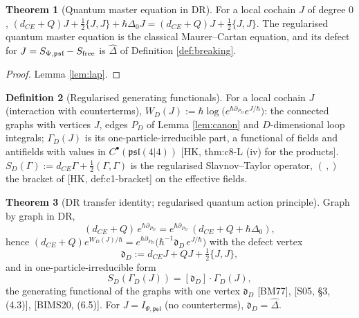 \documentclass[11pt]{article}
\theoremstyle{definition}
\newtheorem{definition}{Definition}[section]
\newtheorem{theorem}[definition]{Theorem}
\numberwithin{equation}{section}
\begin{document}
\begin{theorem}[Quantum master equation in DR]
\label{thm:qme}
For a local cochain $J$ of degree $0$, $(d_{CE}+Q)J+\frac12\{J,J\}+\hbar\Delta_0J=(d_{CE}+Q)J+\frac12\{J,J\}$. The regularised quantum master equation is the classical Maurer--Cartan equation, and its defect for $J=S_{\Psi,\mathfrak{psl}}-S_{\rm free}$ is $\widehat\Delta$ of Definition \ref{def:breaking}.
\end{theorem}

\begin{proof}
Lemma \ref{lem:lap}.
\end{proof}

\begin{definition}[Regularised generating functionals]
\label{def:WD}
For a local cochain $J$ (interaction with counterterms), $W_D(J):=\hbar\log\big(e^{\hbar\partial_{P_D}}e^{J/\hbar}\big)$: the connected graphs with vertices $J$, edges $P_D$ of Lemma \ref{lem:canon} and $D$-dimensional loop integrals; $\Gamma_D(J)$ is its one-particle-irreducible part, a functional of fields and antifields with values in $C^\bullet(\mathfrak{psl}(4|4))$ [HK, thm:c8-L (iv) for the products]. $S_D(\Gamma):=d_{CE}\Gamma+\frac12(\Gamma,\Gamma)$ is the regularised Slavnov--Taylor operator, $(\,,)$ the bracket of [HK, def:c1-bracket] on the effective fields.
\end{definition}

\begin{theorem}[DR transfer identity; regularised quantum action principle]
\label{thm:qap}
Graph by graph in DR,
\begin{equation}
(d_{CE}+Q)\,e^{\hbar\partial_{P_D}}=e^{\hbar\partial_{P_D}}\,(d_{CE}+Q+\hbar\Delta_0),
\label{eq:transferD}
\end{equation}
hence $(d_{CE}+Q)e^{W_D(J)/\hbar}=e^{\hbar\partial_{P_D}}\big(\hbar^{-1}\mathfrak d_D\,e^{J/\hbar}\big)$ with the defect vertex
\[
\mathfrak d_D:=d_{CE}J+QJ+\tfrac12\{J,J\},
\]
and in one-particle-irreducible form
\begin{equation}
S_D(\Gamma_D(J))=[\mathfrak d_D]\cdot\Gamma_D(J),
\label{eq:qapD}
\end{equation}
the generating functional of the graphs with one vertex $\mathfrak d_D$ [BM77], [S05, §3, (4.3)], [BIMS20, (6.5)]. For $J=I_{\Psi,\mathfrak{psl}}$ (no counterterms), $\mathfrak d_D=\widehat\Delta$.
\end{theorem}
\end{document}
